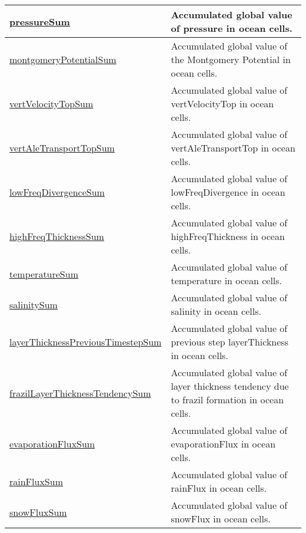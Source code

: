 {\begin{center}
\begin{longtable}{| p{2.0in} | p{4.0in} |}
    \hline
    \hyperref[subsec:var_sec_globalStatsAM_pressureSum]{pressureSum} & Accumulated global value of pressure in ocean cells. \\
    \hline
    \hyperref[subsec:var_sec_globalStatsAM_montgomeryPotentialSum]{montgomeryPotentialSum} & Accumulated global value of the Montgomery Potential in ocean cells. \\
    \hline
    \hyperref[subsec:var_sec_globalStatsAM_vertVelocityTopSum]{vertVelocityTopSum} & Accumulated global value of vertVelocityTop in ocean cells. \\
    \hline
    \hyperref[subsec:var_sec_globalStatsAM_vertAleTransportTopSum]{vertAleTransportTopSum} & Accumulated global value of vertAleTransportTop in ocean cells. \\
    \hline
    \hyperref[subsec:var_sec_globalStatsAM_lowFreqDivergenceSum]{lowFreqDivergenceSum} & Accumulated global value of lowFreqDivergence in ocean cells. \\
    \hline
    \hyperref[subsec:var_sec_globalStatsAM_highFreqThicknessSum]{highFreqThicknessSum} & Accumulated global value of highFreqThickness in ocean cells. \\
    \hline
    \hyperref[subsec:var_sec_globalStatsAM_temperatureSum]{temperatureSum} & Accumulated global value of temperature in ocean cells. \\
    \hline
    \hyperref[subsec:var_sec_globalStatsAM_salinitySum]{salinitySum} & Accumulated global value of salinity in ocean cells. \\
    \hline
    \hyperref[subsec:var_sec_globalStatsAM_layerThicknessPreviousTimestepSum]{layerThicknessPreviousTimestep\-Sum} & Accumulated global value of previous step layerThickness in ocean cells. \\
    \hline
    \hyperref[subsec:var_sec_globalStatsAM_frazilLayerThicknessTendencySum]{frazilLayerThicknessTendency\-Sum} & Accumulated global value of layer thickness tendency due to frazil formation in ocean cells. \\
    \hline
    \hyperref[subsec:var_sec_globalStatsAM_evaporationFluxSum]{evaporationFluxSum} & Accumulated global value of evaporationFlux in ocean cells. \\
    \hline
    \hyperref[subsec:var_sec_globalStatsAM_rainFluxSum]{rainFluxSum} & Accumulated global value of rainFlux in ocean cells. \\
    \hline
    \hyperref[subsec:var_sec_globalStatsAM_snowFluxSum]{snowFluxSum} & Accumulated global value of snowFlux in ocean cells. \\

\end{longtable}
\end{center}}
